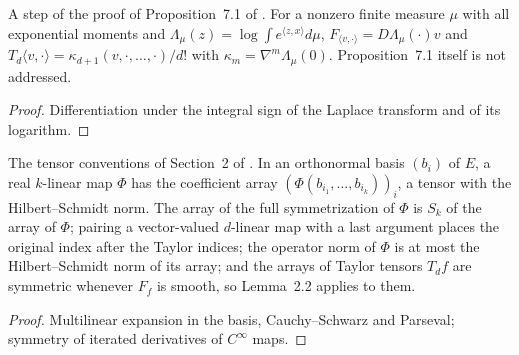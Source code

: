 \begin{lemma}
  \label{lem:bkl-linear-cumulant}
  \leanok
  A step of the proof of Proposition~7.1 of \cite{BizeulKlartagLehec2026}.  For a nonzero finite
  measure $\mu$ with all exponential moments and $\Lambda_\mu(z)=\log\int e^{\langle z,x\rangle}d\mu$,
  $F_{\langle v,\cdot\rangle}=D\Lambda_\mu(\cdot)v$ and
  $T_d\langle v,\cdot\rangle=\kappa_{d+1}(v,\cdot,\dots,\cdot)/d!$ with
  $\kappa_m=\nabla^m\Lambda_\mu(0)$.  Proposition~7.1 itself is not addressed.
\end{lemma}
\begin{proof}
  \leanok
  Differentiation under the integral sign of the Laplace transform and of its logarithm.
\end{proof}

\begin{lemma}
  \label{lem:bkl-taylor-coefficients}
  \leanok
  The tensor conventions of Section~2 of \cite{BizeulKlartagLehec2026}.  In an orthonormal basis
  $(b_i)$ of $E$, a real $k$-linear map $\Phi$ has the coefficient array
  $(\Phi(b_{i_1},\dots,b_{i_k}))_i$, a tensor with the Hilbert--Schmidt norm.  The array of the full
  symmetrization of $\Phi$ is $S_k$ of the array of $\Phi$; pairing a vector-valued $d$-linear map with
  a last argument places the original index after the Taylor indices; the operator norm of $\Phi$ is
  at most the Hilbert--Schmidt norm of its array; and the arrays of Taylor tensors $T_df$ are
  symmetric whenever $F_f$ is smooth, so Lemma~2.2 applies to them.
\end{lemma}
\begin{proof}
  \leanok
  Multilinear expansion in the basis, Cauchy--Schwarz and Parseval; symmetry of iterated
  derivatives of $C^\infty$ maps.
\end{proof}

